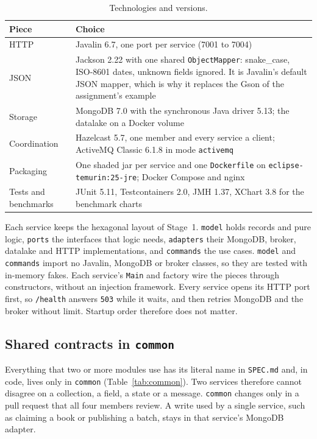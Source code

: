 \documentclass[11pt,a4paper]{article}
\newcommand{\code}[1]{\nolinkurl{#1}}
\newcommand{\mode}[1]{\code{#1}}
\begin{document}
\begin{table}[ht]
\centering
\small
\caption{Technologies and versions.}
\label{tab:stack}
\begin{tabularx}{\textwidth}{@{}L{2.3cm}Y@{}}
\toprule
Piece & Choice \\
\midrule
HTTP & Javalin 6.7, one port per service (7001 to 7004) \\
JSON & Jackson 2.22 with one shared \code{ObjectMapper}: snake\_case, ISO-8601 dates, unknown fields ignored. It is Javalin's default JSON mapper, which is why it replaces the Gson of the assignment's example \\
Storage & MongoDB 7.0 with the synchronous Java driver 5.13; the datalake on a Docker volume \\
Coordination & Hazelcast 5.7, one member and every service a client; ActiveMQ Classic 6.1.8 in mode \mode{activemq} \\
Packaging & One shaded jar per service and one \code{Dockerfile} on \code{eclipse-temurin:25-jre}; Docker Compose and nginx \\
Tests and benchmarks & JUnit 5.11, Testcontainers 2.0, JMH 1.37, XChart 3.8 for the benchmark charts \\
\bottomrule
\end{tabularx}
\end{table}

Each service keeps the hexagonal layout of Stage~1. \code{model} holds records and pure logic, \code{ports} the
interfaces that logic needs, \code{adapters} their MongoDB, broker, datalake and HTTP implementations, and
\code{commands} the use cases. \code{model} and \code{commands} import no Javalin, MongoDB or broker classes, so they
are tested with in-memory fakes. Each service's \code{Main} and factory wire the pieces through constructors, without
an injection framework. Every service opens its HTTP port first, so \code{/health} answers \code{503} while it waits,
and then retries MongoDB and the broker without limit. Startup order therefore does not matter.

\subsection{Shared contracts in \texorpdfstring{\code{common}}{common}}

Everything that two or more modules use has its literal name in \code{SPEC.md} and, in code, lives only in
\code{common} (Table~\ref{tab:common}). Two services therefore cannot disagree on a collection, a field, a state or a
message. \code{common} changes only in a pull request that all four members review. A write used by a single service,
such as claiming a book or publishing a batch, stays in that service's MongoDB adapter.
\end{document}
